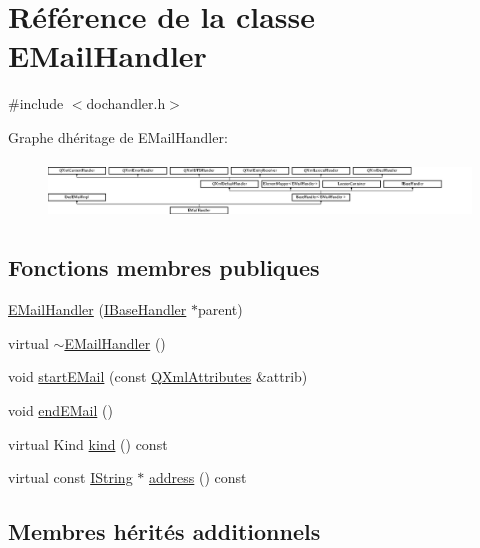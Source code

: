 \hypertarget{class_e_mail_handler}{}\section{Référence de la classe E\+Mail\+Handler}
\label{class_e_mail_handler}


{\ttfamily \#include $<$dochandler.\+h$>$}

Graphe d\textquotesingle{}héritage de E\+Mail\+Handler\+:\begin{figure}[H]
\begin{center}
\leavevmode
\includegraphics[height=1.531100cm]{class_e_mail_handler}
\end{center}
\end{figure}
\subsection*{Fonctions membres publiques}
\begin{DoxyCompactItemize}
\item 
\hyperlink{class_e_mail_handler_a379fc24770548b9862312d90954e75c1}{E\+Mail\+Handler} (\hyperlink{class_i_base_handler}{I\+Base\+Handler} $\ast$parent)
\item 
virtual \hyperlink{class_e_mail_handler_a12f41fe6441231838920c4eb01e9188f}{$\sim$\+E\+Mail\+Handler} ()
\item 
void \hyperlink{class_e_mail_handler_a2c292391ba5f7023ca68233bd8f91f5e}{start\+E\+Mail} (const \hyperlink{class_q_xml_attributes}{Q\+Xml\+Attributes} \&attrib)
\item 
void \hyperlink{class_e_mail_handler_a4d782426c632539133c60abb595f8921}{end\+E\+Mail} ()
\item 
virtual Kind \hyperlink{class_e_mail_handler_afc3b71ddf0a90ffddf26d445377c2aa3}{kind} () const 
\item 
virtual const \hyperlink{class_i_string}{I\+String} $\ast$ \hyperlink{class_e_mail_handler_af9888ae8c67531a3af7ed5e221288100}{address} () const 
\end{DoxyCompactItemize}
\subsection*{Membres hérités additionnels}


